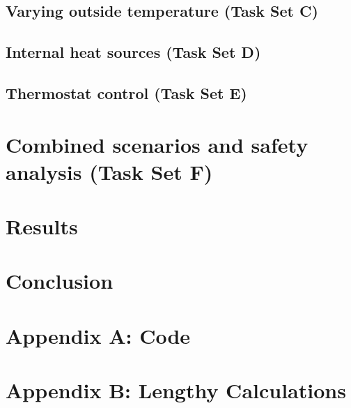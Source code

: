 \documentclass[12pt]{article}
\begin{document}
\subsection{Varying outside temperature (Task Set C)}
\subsection{Internal heat sources (Task Set D)}
\subsection{Thermostat control (Task Set E)}

\section{Combined scenarios and safety analysis (Task Set F)}

\clearpage
\section{Results}

\section{Conclusion}

\clearpage
\appendix
\section{Appendix A: Code}
%

\section{Appendix B: Lengthy Calculations}
\end{document}
